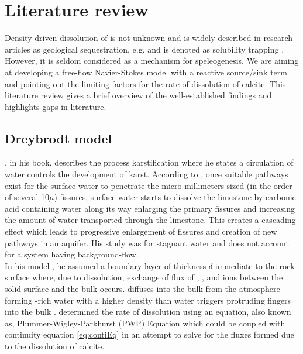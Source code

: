 \chapter{Literature review}\label{chapter:LiteratureReview}
\thispagestyle{empty}

Density-driven dissolution of  is not unknown and is widely described in research articles as 
geological sequestration, e.g.\cite{lindeberg1997reservoir, bachu2007co2} and is denoted as solubility 
trapping \cite{metz2005carbon}. However, it is seldom considered as a mechanism for speleogenesis. 
We are aiming at developing a free-flow Navier-Stokes model with a reactive source/sink term and pointing 
out the limiting factors for the rate of dissolution of calcite. This literature review gives a 
brief overview of the well-established findings and highlights gaps in literature.

\section{Dreybrodt model}\label{sec:dreybrodt}
\citet{Dreybrodt2012}, in his book, describes the process karstification where he states a circulation of water 
controls the development of karst. According to \citet{Dreybrodt2012}, once suitable pathways exist for the 
surface water to penetrate the micro-millimeters sized (in the order of several 10$\mu$) fissures, surface 
water starts to dissolve the limestone by carbonic-acid containing water along its way enlarging the primary fissures 
and increasing the amount of water transported through the limestone. This creates a cascading effect which leads 
to progressive enlargement of fissures and creation of new pathways in an aquifer. His study was for stagnant water 
and does not account for a system having background-flow.\\

In his model \cite{Dreybrodt2012}, he assumed a boundary layer of thickness $\delta$ immediate to the rock surface 
where, due to dissolution, exchange of flux of , , and  ions between the solid 
surface and the bulk occurs.  diffuses into the bulk from the atmosphere forming -rich water with a 
higher density than water triggers protruding fingers into the bulk \cite{Class2020}. \citet{Plummer1978} determined 
the rate of dissolution using an equation, also known as, Plummer-Wigley-Parkhurst (PWP) Equation which could be coupled 
with continuity equation \ref{eq:contiEq} in an attempt to solve for the fluxes formed due to the dissolution of calcite.

